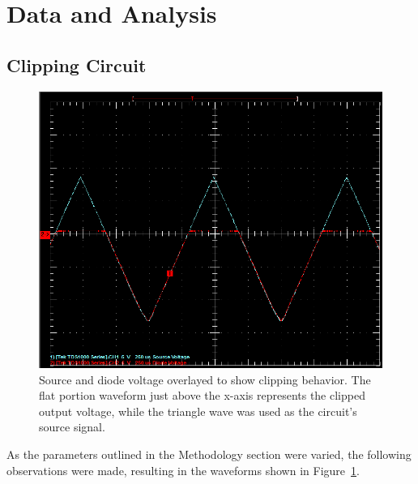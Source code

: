 \documentclass[twocolumn,english]{IEEEtran}
\begin{document}
\noindent\hrulefill


\section{Data and Analysis}
\subsection{\textbf{Clipping Circuit}}

\begin{figure}[h]
  \begin{centering}
  \begin{center}
  \includegraphics[width=\linewidth]{./Circuit_1.png}
  \caption{Source and diode voltage overlayed to show clipping behavior. The flat portion waveform just above the x-axis represents the clipped output voltage, while the triangle wave was used as the circuit's source signal.}
  \label{fig:circuit_1_results}
  \end{center}
  \par\end{centering}
\end{figure}

As the parameters outlined in the Methodology section were varied, the following observations were made, resulting in the waveforms shown in Figure~\ref{fig:circuit_1_results}.
\end{document}
